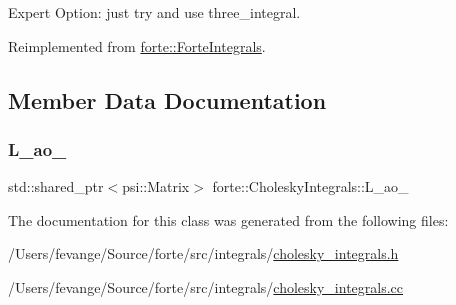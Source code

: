 Expert Option\+: just try and use three\+\_\+integral. 



Reimplemented from \mbox{\hyperlink{classforte_1_1_forte_integrals_a69292bc8e42a76e344cd01c4e3dd48d5}{forte\+::\+Forte\+Integrals}}.



\subsection{Member Data Documentation}
\mbox{\label{classforte_1_1_cholesky_integrals_a0188eee74ee88eeca066cb9420143821}} 
\subsubsection{\texorpdfstring{L\+\_\+ao\+\_\+}{L\_ao\_}}
{\footnotesize\ttfamily std\+::shared\+\_\+ptr$<$psi\+::\+Matrix$>$ forte\+::\+Cholesky\+Integrals\+::\+L\+\_\+ao\+\_\+}



The documentation for this class was generated from the following files\+:\begin{DoxyCompactItemize}
\item 
/\+Users/fevange/\+Source/forte/src/integrals/\mbox{\hyperlink{cholesky__integrals_8h}{cholesky\+\_\+integrals.\+h}}\item 
/\+Users/fevange/\+Source/forte/src/integrals/\mbox{\hyperlink{cholesky__integrals_8cc}{cholesky\+\_\+integrals.\+cc}}\end{DoxyCompactItemize}
